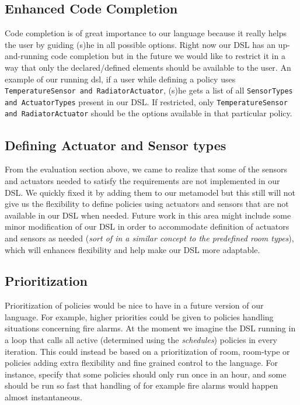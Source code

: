 \subsection{Enhanced Code Completion}\label{subsec:codecompletion}
Code completion is of great importance to our language because it really helps the user by guiding (s)he in all possible options. Right now our DSL has an up-and-running code completion but in the future we would like to restrict it in a way that only the declared/defined elements should be available to the user. An example of our running dsl, if a user while defining a policy uses \texttt{TemperatureSensor and RadiatorActuator}, (s)he gets a list of all \texttt{SensorTypes and ActuatorTypes} present in our DSL. If restricted, only \texttt{TemperatureSensor and RadiatorActuator} should be the options available in that particular policy.

\subsection{Defining Actuator and Sensor types}\label{subsec:def-sensor-actuator-types}
From the evaluation section above, we came to realize that some of the sensors and actuators needed to satisfy the requirements are not implemented in our DSL. We quickly fixed it by adding them to our metamodel but this still will not give us the flexibility to define policies using actuators and sensors that are not available in our DSL when needed. Future work in this area might include some minor modification of our DSL in order to accommodate definition of actuators and sensors as needed (\textit{sort of in a similar concept to the predefined room types}), which will enhances flexibility and help make our DSL more adaptable.


\subsection{Prioritization}\label{subsec:looptime}
Prioritization of policies would be nice to have in a future version of our language. For example, higher priorities could be given to policies handling situations concerning fire alarms. At the moment we imagine the DSL running in a loop that calls all active (determined using the \textit{schedules}) policies in every iteration. This could instead be based on a prioritization of room, room-type or policies adding extra flexibility and fine grained control to the language. For instance, specify that some policies should only run once in an hour, and some should be run so fast that handling of for example fire alarms would happen almost instantaneous. 

